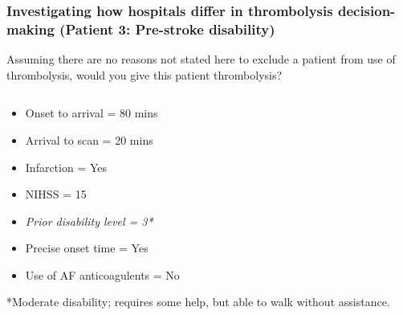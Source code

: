 \documentclass{beamer}
\begin{document}
\begin{frame}
\frametitle{Investigating how hospitals differ in thrombolysis decision-making (Patient 3: Pre-stroke disability)}

Assuming there are no reasons not stated here to exclude a patient from use of thrombolysis, would you give this patient thrombolysis?

\vspace{3mm}


\begin{columns}
    \begin{column}{0.5\textwidth}
        \begin{itemize}
            \item Onset to arrival = 80 mins
            \item Arrival to scan = 20 mins
            \item Infarction = Yes
            \item NIHSS = 15
            \item \emph{Prior disability level = 3*}
            \item Precise onset time = Yes
            \item Use of AF anticoagulents = No
        \end{itemize}
    \vspace{3mm}    
    \footnotesize{*Moderate disability; requires some help, but able to walk without assistance.}
    \end{column}
    
    \begin{column}{0.4\textwidth}
    
    \end{column}

\end{columns}
\end{frame}

\end{document}
